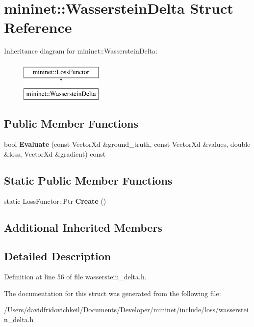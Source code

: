 \hypertarget{structmininet_1_1_wasserstein_delta}{}\section{mininet\+:\+:Wasserstein\+Delta Struct Reference}
\label{structmininet_1_1_wasserstein_delta}
Inheritance diagram for mininet\+:\+:Wasserstein\+Delta\+:\begin{figure}[H]
\begin{center}
\leavevmode
\includegraphics[height=2.000000cm]{structmininet_1_1_wasserstein_delta}
\end{center}
\end{figure}
\subsection*{Public Member Functions}
\begin{DoxyCompactItemize}
\item 
\hypertarget{structmininet_1_1_wasserstein_delta_ad77747cd1778d2e3a79627174222ad11}{}\label{structmininet_1_1_wasserstein_delta_ad77747cd1778d2e3a79627174222ad11} 
bool {\bfseries Evaluate} (const Vector\+Xd \&ground\+\_\+truth, const Vector\+Xd \&values, double \&loss, Vector\+Xd \&gradient) const
\end{DoxyCompactItemize}
\subsection*{Static Public Member Functions}
\begin{DoxyCompactItemize}
\item 
\hypertarget{structmininet_1_1_wasserstein_delta_afab86483f88ec3a73e0194545b73ad7e}{}\label{structmininet_1_1_wasserstein_delta_afab86483f88ec3a73e0194545b73ad7e} 
static Loss\+Functor\+::\+Ptr {\bfseries Create} ()
\end{DoxyCompactItemize}
\subsection*{Additional Inherited Members}


\subsection{Detailed Description}


Definition at line 56 of file wasserstein\+\_\+delta.\+h.



The documentation for this struct was generated from the following file\+:\begin{DoxyCompactItemize}
\item 
/\+Users/davidfridovichkeil/\+Documents/\+Developer/mininet/include/loss/wasserstein\+\_\+delta.\+h\end{DoxyCompactItemize}
